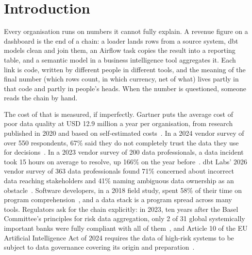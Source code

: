 \section{Introduction}
\label{sec:introduction}

Every organisation runs on numbers it cannot fully explain. A revenue figure on a dashboard is the
end of a chain: a loader lands rows from a source system, dbt models clean and join them, an
Airflow task copies the result into a reporting table, and a semantic model in a business
intelligence tool aggregates it. Each link is code, written by different people in different
tools, and the meaning of the final number (which rows count, in which currency, net of what)
lives partly in that code and partly in people's heads. When the number is questioned, someone
reads the chain by hand.

The cost of that is measured, if imperfectly. Gartner puts the average cost of poor data quality
at USD 12.9 million a year per organisation, from research published in 2020 and based on
self-estimated costs~\citep{gartner2020dq}. In a 2024 vendor survey of over 550 respondents, 67\%
said they do not completely trust the data they use for decisions~\citep{precisely2024}. In a 2023
vendor survey of 200 data professionals, a data incident took 15 hours on average to resolve, up
166\% on the year before~\citep{montecarlo2023}. dbt Labs' 2026 vendor survey of 363 data
professionals found 71\% concerned about incorrect data reaching stakeholders and 41\% naming
ambiguous data ownership as an obstacle~\citep{dbt2026state}. Software developers, in a 2018 field
study, spent 58\% of their time on program comprehension~\citep{xia2018comprehension}, and a data
stack is a program spread across many tools. Regulators ask for the chain explicitly: in 2023, ten
years after the Basel Committee's principles for risk data aggregation, only 2 of 31 global
systemically important banks were fully compliant with all of them~\citep{bcbs2023}, and Article 10
of the EU Artificial Intelligence Act of 2024 requires the data of high-risk systems to be subject
to data governance covering its origin and preparation~\citep{euaiact}.

